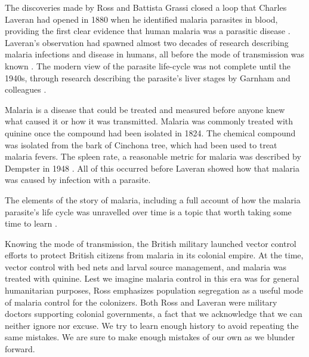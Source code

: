 \documentclass[
]{book}
\begin{document}
The discoveries made by Ross and Battista Grassi closed a loop that Charles Laveran had opened in 1880 when he identified malaria parasites in blood, providing the first clear evidence that human malaria was a parasitic disease \autocite{Laveran1880,Laveran1884}.
Laveran's observation had spawned almost two decades of research describing malaria infections and disease in humans, all before the mode of transmission was known \autocite{GarnhamPCC1988HistoryDiscoveries}.
The modern view of the parasite life-cycle was not complete until the 1940s, through research describing the parasite's liver stages by Garnham and colleagues \autocite{ShorttHE1948PreerythrocyticStage,GarnhamPCC1988HistoryDiscoveries}.

Malaria is a disease that could be treated and measured before anyone knew what caused it or how it was transmitted.
Malaria was commonly treated with quinine once the compound had been isolated in 1824.
The chemical compound was isolated from the bark of Cinchona tree, which had been used to treat malaria fevers.
The spleen rate, a reasonable metric for malaria was described by Dempster in 1948 \autocite{Dempster1848SpleenRate}.
All of this occurred before Laveran showed how that malaria was caused by infection with a parasite.

The elements of the story of malaria, including a full account of
how the malaria parasite's life cycle was unravelled over time is a topic that worth taking some time to learn \autocite{Bruce-ChwattLJ1988HistoryMalaria,GarnhamPCC1988HistoryDiscoveries,ServiceMW1978ShortHistory,CoxFEG2010HistoryDiscovery}.

Knowing the mode of transmission, the British military launched vector control efforts to protect British citizens from malaria in its colonial empire.
At the time, vector control with bed nets and larval source management, and malaria was treated with quinine.
Lest we imagine malaria control in this era was for general humanitarian purposes, Ross emphasizes population segregation as a useful mode of malaria control for the colonizers.
Both Ross and Laveran were military doctors supporting colonial governments, a fact that we acknowledge that we can neither ignore nor excuse.
We try to learn enough history to avoid repeating the same mistakes.
We are sure to make enough mistakes of our own as we blunder forward.
\end{document}
